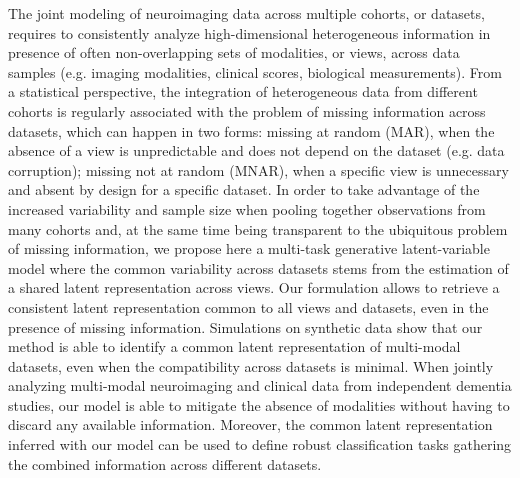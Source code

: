 The joint modeling of neuroimaging data across multiple cohorts, or datasets, requires to consistently analyze high-dimensional heterogeneous information in presence of often non-overlapping sets of modalities, or views, across data samples (e.g. imaging modalities, clinical scores, biological measurements).
From a statistical perspective, the integration of heterogeneous data from different cohorts is regularly associated with the problem of missing information across datasets, which can happen in two forms:
missing at random (MAR), when the absence of a view is unpredictable and does not depend on the dataset (e.g. data corruption);
missing not at random (MNAR), when a specific view is unnecessary and absent by design for a specific dataset.
%
In order to take advantage of the increased variability and sample size when pooling together observations from many cohorts
and, at the same time being transparent to the ubiquitous problem of missing information,
we propose here a multi-task generative latent-variable model where the common variability across datasets stems from the estimation of a shared latent representation across views.
Our formulation allows to retrieve a consistent latent representation common to all views and datasets, even in the presence of missing information.
%
Simulations on synthetic data show that our method is able to identify a common latent representation of multi-modal datasets, even when the compatibility across datasets is minimal.
%
When jointly analyzing multi-modal neuroimaging and clinical data from independent dementia studies, our model is able to mitigate the absence of modalities without having to discard any available information.
Moreover, the common latent representation inferred with our model can be used to define robust classification tasks gathering the combined information across different datasets.

